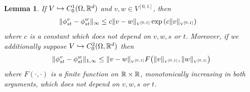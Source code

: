 \documentclass[noinfoline]{imsart}
\newtheorem{lemma}{Lemma}
\begin{document}
\begin{lemma} If $V\hookrightarrow C_0^1(\Omega,\Bbb R^d)$ and $v,w\in V^{[0,1]}$, then
\begin{align}
 \|\phi_{st}^v - \phi_{st}^w    \|_{\infty}& \leq c \| v-w \|_\text{\tiny $V^{[0,1]}$} \exp{\left( c\| v \|_\text{\tiny $V^{[0,1]}$} \right)}
  \label{222}
\end{align}
where $c$ is a constant which does not depend on $v, w, s$ or $t$.
Moreover, if we additionally suppose $V\hookrightarrow C_0^2(\Omega, \Bbb R^d)$ then
\begin{align}
  \label{777}
\| \phi_{st}^v - \phi_{st}^w \|_{1,\infty}\leq \| v-w \|_\text{\tiny $V^{[0,1]}$}  F\bigl( {\|v\|_\text{\tiny $V^{[0,1]}$}},{\|w\|_\text{\tiny $V^{[0,1]}$}}\bigr)
\end{align}
where $F(\cdot,\cdot)$ is  a finite  function on $\Bbb R\times \Bbb R$, monotonically increasing in both arguments, which does not depend on $v, w, s$ or $t$.
\end{lemma}
\end{document}
